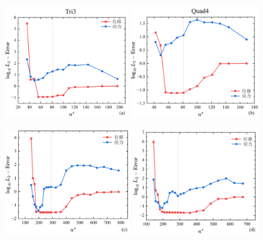 \begin{figure}[!h]
    \centering
    \begin{subcaptiongroup}
    \includegraphics[width=0.48\textwidth]{figures/shearlocking/T3-l2-ns8.png}
    \label{T3-l2-ns8}
    \includegraphics[width=0.50\textwidth]{figures/shearlocking/Q4-l2-ns8.png}
    \label{Q4-l2-ns8}
    \end{subcaptiongroup}
    \begin{subcaptiongroup}
    \includegraphics[width=0.49\textwidth]{figures/shearlocking/T3-l2-ns16.png}
    \label{T3-l2-ns16}
    \includegraphics[width=0.49\textwidth]{figures/shearlocking/Q4-l2-ns16.png}

\end{subcaptiongroup}
\end{figure}
